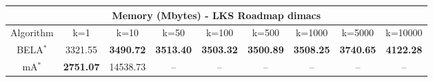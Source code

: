 \begin{tabular}{c|cccccccc}\toprule
\multicolumn{9}{c}{Memory (Mbytes) - LKS Roadmap dimacs}\\ \midrule
Algorithm & k=1 & k=10 & k=50 & k=100 & k=500 & k=1000 & k=5000 & k=10000 \\ \midrule
BELA$^*$ & 3321.55 & \textbf{3490.72} & \textbf{3513.40} & \textbf{3503.32} & \textbf{3500.89} & \textbf{3508.25} & \textbf{3740.65} & \textbf{4122.28} \\
mA$^*$ & \textbf{2751.07} & 14538.73 & -- & -- & -- & -- & -- & -- \\ \bottomrule 
\end{tabular}
